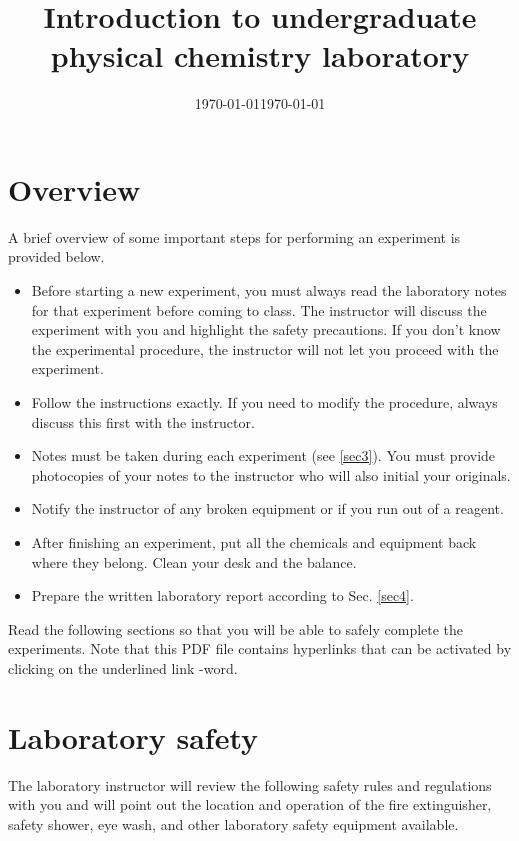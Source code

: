 \documentclass[byrevtex,amssymb,aps,pra,floatfix,letterpaper]{revtex4}
\date{\today}
\begin{document}
\title{Introduction to undergraduate physical chemistry laboratory}

\date{\today}

\maketitle

\section{Overview}
\label{sec1}

A brief overview of some important steps for performing an experiment is provided below.

\begin{itemize}
\item Before starting a new experiment, you must always read the laboratory notes for that experiment before coming to class. The instructor will discuss the experiment with you and highlight the safety precautions. If you don't know the experimental procedure, the instructor will not let you proceed with the experiment.
\item Follow the instructions exactly. If you need to modify the procedure, always discuss this first with the instructor.
\item Notes must be taken during each experiment (see \ref{sec3}). You must provide photocopies of your notes to the instructor who will also initial your originals.
\item Notify the instructor of any broken equipment or if you run out of a reagent.
\item After finishing an experiment, put all the chemicals and equipment back where they belong. Clean your desk and the balance.
\item Prepare the written laboratory report according to Sec. \ref{sec4}.
\end{itemize}

\noindent
Read the following sections so that you will be able to safely complete the experiments. Note that this PDF file contains hyperlinks that can be activated by clicking on the underlined link -word.

\section{Laboratory safety}
\label{sec2}
\noindent
The laboratory instructor will review the following safety rules and regulations with you and will point out the location and operation of the fire extinguisher, safety shower, eye wash, and other laboratory safety equipment available.\\
\end{document}
